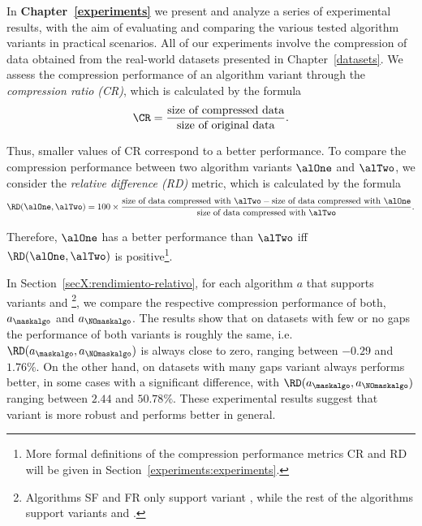 In \textbf{Chapter~\ref{experiments}} we present and analyze a series of experimental results, with the aim of evaluating and comparing the various tested algorithm variants in practical scenarios. All of our experiments involve the compression of data obtained from the real-world datasets presented in Chapter~\ref{datasets}. We assess the compression performance of an algorithm variant through the \textit{compression ratio (CR)}, which is calculated by the formula
\vspace{-2pt}
\begin{equation}
\CR = \frac{\textnormal{size of compressed data}}{\textnormal{size of original data}}.
\end{equation}


\clearpage


\newcommand{\footCRRD}{\footnote{More formal definitions of the compression performance metrics CR and RD will be given in Section~\ref{experiments:experiments}.}}

Thus, smaller values of CR correspond to a better performance. To compare the compression performance between two algorithm variants $\alOne$ and $\alTwo$, we consider the \textit{relative difference (RD)} metric, which is calculated by the formula
\vspace{-2pt}
\newcommand{\sizeofd}{\textnormal{size of data compressed with }}
\begin{equation}
\RD(\alOne, \alTwo) = 100\times\frac{\sizeofd \alTwo - \sizeofd \alOne}{\sizeofd \alTwo}.
\end{equation}

\vspace{-2pt}
Therefore, $\alOne$ has a better performance than $\alTwo$ iff $\RD(\alOne, \alTwo)$ is positive\footCRRD.


\newcommand{\footSupportBoth}{\footnote{Algorithms SF and FR only support variant \maskalgo, while the rest of the algorithms support variants \maskalgo and \NOmaskalgo.}}


In Section~\ref{secX:rendimiento-relativo}, for each algorithm $a$ that supports variants \maskalgo and \NOmaskalgo\footSupportBoth, we compare the respective compression performance of both, $a_\maskalgo$ and $a_\NOmaskalgo$. The results show that on datasets with few or no gaps the performance of both variants is roughly the same, i.e. $\RD(a_\maskalgo, a_\NOmaskalgo)$ is always close to zero, ranging between $-0.29$ and $1.76\%$. On the other hand, on datasets with many gaps variant \maskalgo always performs better, in some cases with a significant difference, with $\RD(a_\maskalgo, a_\NOmaskalgo)$ ranging between $2.44$ and $50.78\%$. These experimental results suggest that variant \maskalgo is more robust and performs better in general.


